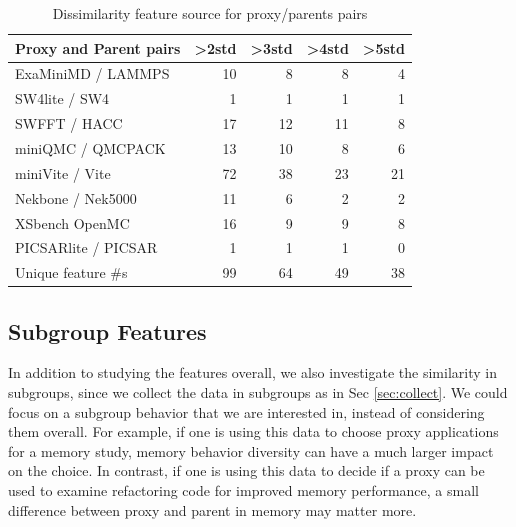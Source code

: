 \documentclass[conference]{IEEEtran}
\begin{document}
\begin{table}[t]
\caption{Dissimilarity feature source for proxy/parents pairs}
\label{tab:Dissimilarity}
\centering
\begin{tabular}{lrrrr}%
\toprule
\textbf{Proxy and Parent pairs}               & \textbf{\textgreater{}2std} & \textbf{\textgreater{}3std} & \textbf{\textgreater{}4std} & \textbf{\textgreater{}5std} \\ \midrule
ExaMiniMD / LAMMPS                            & 10                          & 8                           & 8                           & 4                           \\ 
SW4lite / SW4                                 & 1                           & 1                           & 1                           & 1                           \\ 
SWFFT / HACC                                  & 17                          & 12                          & 11                          & 8                           \\ 
miniQMC / QMCPACK                             & 13                          & 10                          & 8                           & 6                           \\ 
miniVite / Vite                               & 72                          & 38                          & 23                          & 21                          \\ 
Nekbone / Nek5000                             & 11                          & 6                           & 2                           & 2                           \\ 
XSbench OpenMC                                & 16                          & 9                           & 9                           & 8                           \\ 
PICSARlite / PICSAR                           & 1                           & 1                           & 1                           & 0                           \\ 
Unique feature \#s & 99                          & 64                          & 49                          & 38                          \\ \bottomrule
\end{tabular}

\end{table}


\subsection{Subgroup Features}
\label{sec:subgroup}
In addition to studying the features overall, we also investigate the similarity in subgroups, since we collect the data in subgroups as in Sec \ref{sec:collect}. We could focus on a subgroup behavior that we are interested in, instead of considering them overall. 
For example, if one is using this data to choose proxy applications for a memory study, memory behavior diversity can have a much larger impact on the choice. In contrast, if one is using this data to decide if a proxy can be used to examine refactoring code for improved memory performance, a small difference between proxy and parent in memory may matter more.
\end{document}
